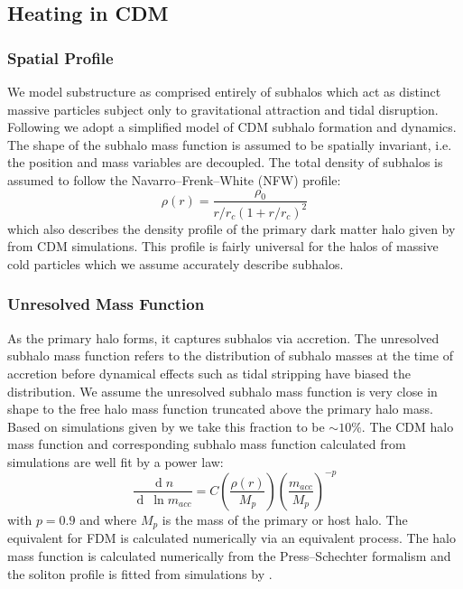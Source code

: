 \documentclass[usenatbib]{mnras}
\renewcommand{\d}[1]{\! \mathrm{d}#1 \:}
\renewcommand{\d}[1]{\ensuremath{\operatorname{d}\!{#1}}}
\begin{document}
\subsection{Heating in CDM}

\subsubsection{Spatial Profile}

	We model substructure as comprised entirely of subhalos which act as distinct massive particles subject only to gravitational attraction and tidal disruption. Following \citet{tidal_limit, unified_model} we adopt a
simplified model of CDM subhalo
formation and dynamics. The shape of
the subhalo mass function is assumed to
be spatially invariant, i.e. the position
and mass variables are decoupled. The
total density of subhalos is assumed to
follow the Navarro--Frenk--White (NFW) profile:
\begin{equation}
\rho(r) = \frac{\rho_0}{r/r_c (1+r/r_c)^2}
\end{equation} which also
describes the density profile of the
primary dark matter halo given by \citet{structure} from CDM simulations. This profile is fairly universal for the halos of massive cold particles which we assume accurately describe subhalos.

\subsubsection{Unresolved Mass Function}

	As the primary halo forms, it captures subhalos via accretion. The unresolved subhalo mass function refers to the distribution of subhalo masses at the time of accretion before dynamical effects such as tidal stripping have biased the distribution. We assume the unresolved subhalo mass function is very close in shape to the free halo mass function truncated above the primary halo mass. Based on simulations given by \citet{dark_wave} we take this fraction to be $\sim 10\%$. The CDM halo mass function and corresponding subhalo mass function calculated from simulations \citep{pop_of_subhalos, unified_model} are well fit by a power law: 
\begin{equation}
\frac{\d{n}}{\d{\: \ln{m_{acc}}}} = C \left(\frac{\rho(r)}{M_p}\right) \left(\frac{m_{acc}}{M_p} \right)^{-p} 
\end{equation}
with $p = 0.9$ and where $M_p$ is the mass of the primary or host halo. The equivalent for FDM is calculated numerically via an equivalent process. The halo mass function is calculated numerically from the Press--Schechter formalism \citep{substructure_FDM, marsh} and the soliton profile is fitted from simulations by \cite{schive_solitons}. 
\par
\end{document}
